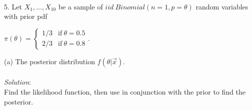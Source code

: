 \documentclass[12pt]{article}
\newcommand{\XB}{\color{black}}
\newcommand{\XBB}{\color{blue}}
\begin{document}
\vspace{2.5mm}

\newpage
\XBB\hrulefill\XB \\

5. Let $ X_{1}, \dots , X_{10} $ be a sample of $ iid \ Binomial(n = 1, p = \theta) $ random variables
with prior pdf \\ 
\begin{center}
    $\pi(\theta) = 
    \begin{cases} 
        1/3 & \text{if} \ \theta = 0.5 \\
        2/3 & \text{if} \ \theta = 0.8
    \end{cases} $. \\ 
\end{center}



\XBB\hrulefill\XB 
\vspace{5mm} 

(a) The posterior distribution $ f(\theta | \overrightarrow{x}) $. \\
\vspace{2.5mm} \\
\textit{Solution}:
\vspace{2.5mm} \\

\noindent
Find the likelihood function, then use in conjunction with the prior to find the posterior. \\
\end{document}
